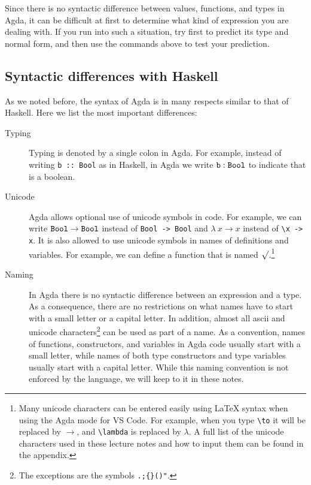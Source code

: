\documentclass[a4paper,UKenglish]{tufte-handout}
\theoremstyle{definition}
\newcommand\fun[1]{{\AgdaFunction{#1}}}
\newcommand\data[1]{{\AgdaFunction{#1}}}
\newcommand\Bool{\data{Bool}}
\begin{document}
Since there is no syntactic difference between values, functions, and types in
Agda, it can be difficult at first to determine what kind of expression you are
dealing with. If you run into such a situation, try first to predict its type
and normal form, and then use the commands above to test your prediction.

\subsection{Syntactic differences with Haskell}

As we noted before, the syntax of Agda is in many respects similar to
that of Haskell. Here we list the most important differences:

\begin{description}

\item[Typing] Typing is denoted by a single colon in Agda. For example, instead
of writing \texttt{b ::~Bool} as in Haskell, in Agda we write $\fun{b} : \Bool$
to indicate that \fun{b} is a boolean.

\item[Unicode] Agda allows optional use of unicode symbols in
  code. For example, we can write $\Bool \to \Bool$ instead of
  \texttt{Bool -> Bool} and $\lambda\ x \to x$ instead of
  \texttt{\textbackslash x -> x}. It is also allowed to use unicode
  symbols in names of definitions and variables. For example, we can
  define a function that is named $\surd$.\footnote[][-2cm]{Many
    unicode characters can be entered easily using LaTeX syntax when
    using the Agda mode for VS Code. For example, when you type
    \texttt{\textbackslash{}to} it will be replaced by $\to$, and
    \texttt{\textbackslash{}lambda} is replaced by $\lambda$. A full
    list of the unicode characters used in these lecture notes and how
    to input them can be found in the appendix.}

\item[Naming] In Agda there is no syntactic difference between an
  expression and a type. As a consequence, there are no restrictions
  on what names have to start with a small letter or a capital
  letter. In addition, almost all ascii and unicode
  characters\footnote{The exceptions are the symbols
  \texttt{.;\{\}()\@"}.} can be used as part of a name. As a
  convention, names of functions, constructors, and variables in Agda
  code usually start with a small letter, while names of both type
  constructors and type variables usually start with a capital
  letter. While this naming convention is not enforced by the
  language, we will keep to it in these notes.


\end{description}
\end{document}
